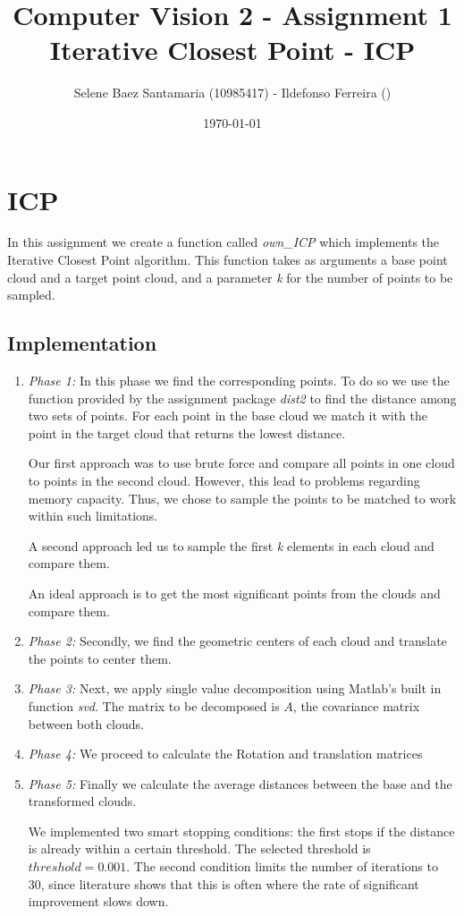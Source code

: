 \documentclass[11pt]{article}
\title{
	{Computer Vision 2 - Assignment 1\\
	 Iterative Closest Point - ICP}
}
\author{
Selene Baez Santamaria (10985417) - Ildefonso Ferreira ()}
\date{\today}
\begin{document}
\maketitle

\section{ICP}
In this assignment we create a function called \textit{own\_ICP} which implements the Iterative Closest Point algorithm. This function takes as arguments a base point cloud and a target point cloud, and a parameter \textit{k} for the number of points to be sampled. 

\subsection{Implementation}

\begin{enumerate}
	\item \textit{Phase 1:} In this phase we find the corresponding points. To do so we use the function provided by the assignment package \textit{dist2} to find the distance among two sets of points. For each point in the base cloud we match it with the point in the target cloud that returns the lowest distance. 
	
	Our first approach was to use brute force and compare all points in one cloud to points in the second cloud. However, this lead to problems regarding memory capacity. Thus, we chose to sample the points to be matched to work within such limitations.
	
	A second approach led us to sample the first \textit{k} elements in each cloud and compare them.
	
	An ideal approach is to get the most significant points from the clouds and compare them. %
	
	\item \textit{Phase 2:} Secondly, we find the geometric centers of each cloud and translate the points to center them. 
	
	\item \textit{Phase 3:} Next, we apply single value decomposition using Matlab's built in function \textit{svd}. The matrix to be decomposed is $A$, the covariance matrix between both clouds. 
	
	\item \textit{Phase 4:} We proceed to calculate the Rotation and translation matrices
	
	\item \textit{Phase 5:} Finally we calculate the average distances between the base and the transformed clouds. 
	
	We implemented two smart stopping conditions: the first stops if the distance is already within a certain threshold. The selected threshold is $ threshold = 0.001 $. The second condition limits the number of iterations to 30, since literature shows that this is often where the rate of significant improvement slows down.
\end{enumerate}
\end{document}
